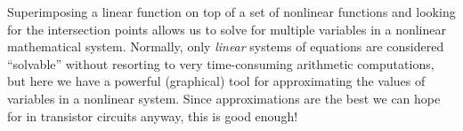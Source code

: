 Superimposing a linear function on top of a set of nonlinear functions and looking for the intersection points allows us to solve for multiple variables in a nonlinear mathematical system.  Normally, only {\it linear} systems of equations are considered ``solvable'' without resorting to very time-consuming arithmetic computations, but here we have a powerful (graphical) tool for approximating the values of variables in a nonlinear system.  Since approximations are the best we can hope for in transistor circuits anyway, this is good enough!












